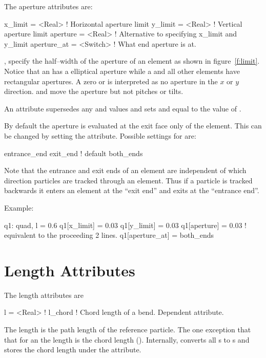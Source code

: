 The aperture attributes are:
\begin{example}
  x_limit  = <Real>      ! Horizontal aperture limit
  y_limit  = <Real>      ! Vertical aperture limit
  aperture = <Real>      ! Alternative to specifying x_limit and y_limit
  aperture_at = <Switch> ! What end aperture is at.
\end{example}
,  specify the half--width of the aperture of
an element as shown in figure~\ref{f:limit}. Notice that an 
has a elliptical aperture while a  and all other elements
have rectangular apertures. A zero  or
 is interpreted as no aperture in the $x$ or $y$
direction.  and  move the aperture but not
pitches or tilts.

An  attribute supersedes
any  and  values and sets  and
 equal to the value of .

By default the aperture is evaluated at the exit face only of the
element. This can be changed by setting the  attribute.
Possible settings for  are:
\begin{example}
  entrance_end
  exit_end  ! default
  both_ends
\end{example}
Note that the entrance and exit ends of an element are independent of
which direction particles are tracked through an element. Thus if a
particle is tracked backwards it enters an element at the ``exit end''
and exits at the ``entrance end''.

Example:
\begin{example}
  q1: quad, l = 0.6
  q1[x_limit] = 0.03
  q1[y_limit] = 0.03
  q1[aperture] = 0.03  ! equivalent to the proceeding 2 lines.  
  q1[aperture_at] = both_ends
\end{example}

\section{Length Attributes}
\label{s:l}

The length attributes are
\begin{example}
  l       = <Real>  ! 
  l_chord           ! Chord length of a bend. Dependent attribute.
\end{example}
The length  is the path length of the reference
particle. The one exception that that for an  the length
 is the chord length (). Internally, \bmad converts
all s to s and stores the chord length
under the  attribute.

